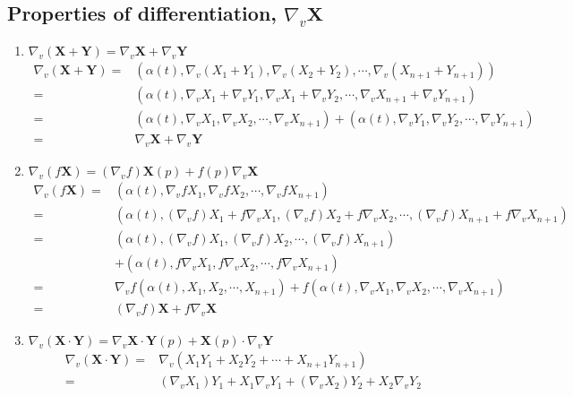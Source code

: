\subsection{Properties of differentiation, $\nabla_v \mathbf{X}$}
\begin{enumerate}
	\item $\nabla_v (\mathbf{X} + \mathbf{Y}) = \nabla_v \mathbf{X} + \nabla_v \mathbf{Y}$
	\begin{align*}
		\nabla_v (\mathbf{X}+\mathbf{Y}) = & \left( \alpha(t),\nabla_v(X_1+Y_1),\nabla_v (X_2+Y_2),\cdots,\nabla_v(X_{n+1}+Y_{n+1}) \right) \\
		= & \left( \alpha(t), \nabla_v X_1 + \nabla_v Y_1, \nabla_v X_1 + \nabla_v Y_2, \cdots, \nabla_v X_{n+1} + \nabla_v Y_{n+1} \right) \\
		= & \left( \alpha(t), \nabla_v X_1, \nabla_v X_2, \cdots, \nabla_v X_{n+1} \right) + \left( \alpha(t), \nabla_v Y_1, \nabla_v Y_2, \cdots, \nabla_v Y_{n+1} \right)\\
		= & \nabla_v \mathbf{X} + \nabla_v \mathbf{Y}
	\end{align*}
	\item $\nabla_v (f\mathbf{X}) = (\nabla_v f)\mathbf{X}(p) + f(p) \nabla_v \mathbf{X}$ 
	\begin{align*}
		\nabla_v (f\mathbf{X}) = & \left( \alpha(t), \nabla_v fX_1, \nabla_v fX_2, \cdots, \nabla_v fX_{n+1} \right) \\
		= & \left( \alpha(t), (\nabla_v f) X_1  + f\nabla_v X_1, (\nabla_v f)X_2 + f\nabla_v X_2,\cdots,(\nabla_v f)X_{n+1} + f\nabla_v X_{n+1} \right) \\
		= & \left( \alpha(t), (\nabla_v f)X_1,(\nabla_v f)X_2,\cdots,(\nabla_v f)X_{n+1} \right)\\
		& + \left( \alpha(t), f\nabla_v X_1, f\nabla_v X_2,\cdots, f\nabla_v X_{n+1} \right)\\
		= & \nabla_v f (\alpha(t),X_1,X_2,\cdots,X_{n+1}) + f(\alpha(t),\nabla_v X_1,\nabla_v X_2,\cdots,\nabla_v X_{n+1})\\
		=& (\nabla_v f)\mathbf{X} + f\nabla_v \mathbf{X}
	\end{align*}
	\item $\nabla_v (\mathbf{X} \cdot \mathbf{Y}) = \nabla_v \mathbf{X} \cdot \mathbf{Y}(p) + \mathbf{X}(p) \cdot \nabla_v \mathbf{Y} $
	\begin{align*}
		\nabla_v(\mathbf{X} \cdot \mathbf{Y}) = & \nabla_v (X_1Y_1 + X_2Y_2 + \cdots + X_{n+1}Y_{n+1}) \\
		= & (\nabla_v X_1)Y_1 + X_1\nabla_v Y_1 + (\nabla_v X_2) Y_2 + X_2\nabla_v Y_2\\

\end{align*}
\end{enumerate}
